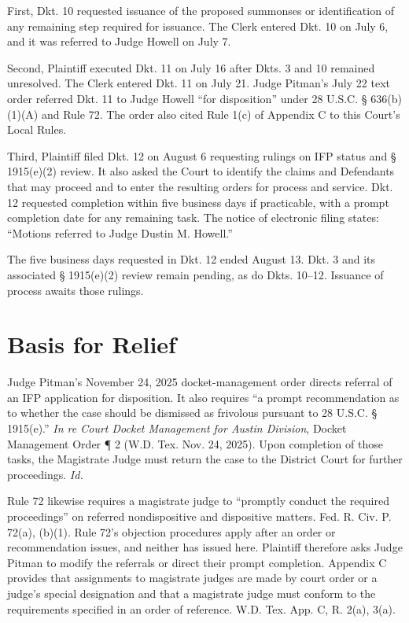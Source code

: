 \documentclass[12pt]{article}
\begin{document}
First, Dkt. 10 requested issuance of the proposed summonses or identification of any remaining step required for issuance. The Clerk entered Dkt. 10 on July 6, and it was referred to Judge Howell on July 7.

Second, Plaintiff executed Dkt. 11 on July 16 after Dkts. 3 and 10 remained unresolved. The Clerk entered Dkt. 11 on July 21. Judge Pitman's July 22 text order referred Dkt. 11 to Judge Howell ``for disposition'' under 28 U.S.C. § 636(b)(1)(A) and Rule 72. The order also cited Rule 1(c) of Appendix C to this Court's Local Rules.

Third, Plaintiff filed Dkt. 12 on August 6 requesting rulings on IFP status and § 1915(e)(2) review. It also asked the Court to identify the claims and Defendants that may proceed and to enter the resulting orders for process and service. Dkt. 12 requested completion within five business days if practicable, with a prompt completion date for any remaining task. The notice of electronic filing states: ``Motions referred to Judge Dustin M. Howell.''

The five business days requested in Dkt. 12 ended August 13. Dkt. 3 and its associated § 1915(e)(2) review remain pending, as do Dkts. 10--12. Issuance of process awaits those rulings.

\section*{Basis for Relief}

Judge Pitman's November 24, 2025 docket-management order directs referral of an IFP application for disposition. It also requires ``a prompt recommendation as to whether the case should be dismissed as frivolous pursuant to 28 U.S.C. § 1915(e).'' \textit{In re Court Docket Management for Austin Division}, Docket Management Order ¶ 2 (W.D. Tex. Nov. 24, 2025). Upon completion of those tasks, the Magistrate Judge must return the case to the District Court for further proceedings. \textit{Id.}

Rule 72 likewise requires a magistrate judge to ``promptly conduct the required proceedings'' on referred nondispositive and dispositive matters. Fed. R. Civ. P. 72(a), (b)(1). Rule 72's objection procedures apply after an order or recommendation issues, and neither has issued here. Plaintiff therefore asks Judge Pitman to modify the referrals or direct their prompt completion. Appendix C provides that assignments to magistrate judges are made by court order or a judge's special designation and that a magistrate judge must conform to the requirements specified in an order of reference. W.D. Tex. App. C, R. 2(a), 3(a).
\end{document}
